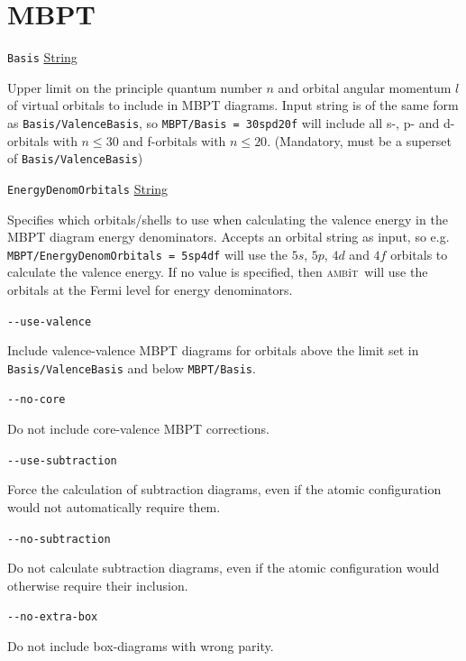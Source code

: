 \documentclass{report}
\newcommand{\ambit}{\textsc{amb}{\footnotesize i}\textsc{t}}
\begin{document}
\section{MBPT}

\texttt{Basis} \uline{String}
\begin{adjustwidth}{1cm}{}
Upper limit on the principle quantum number $n$ and orbital angular momentum $l$ of
virtual orbitals to include in MBPT diagrams. Input string is of the same form as
\texttt{Basis/ValenceBasis}, so \texttt{MBPT/Basis = 30spd20f} will include all s-, p- and d-orbitals
with $n \leq 30$ and f-orbitals with $n \leq 20$. (Mandatory, must be a superset of
\texttt{Basis/ValenceBasis})
\end{adjustwidth}

\texttt{EnergyDenomOrbitals} \uline{String}
\begin{adjustwidth}{1cm}{}
Specifies which orbitals/shells to use when calculating the valence energy
in the MBPT diagram energy denominators. Accepts an orbital string as input, so e.g. 
\texttt{MBPT/EnergyDenomOrbitals = 5sp4df} will use the $5s$, $5p$, $4d$ and $4f$ orbitals to calculate
the valence energy. If no value is specified, then \ambit\ will use the orbitals at the Fermi level for
energy denominators.
\end{adjustwidth}

\texttt{{-}{-}use-valence}
\begin{adjustwidth}{1cm}{}
Include valence-valence MBPT diagrams for orbitals above the limit set in \texttt{Basis/ValenceBasis} 
and below \texttt{MBPT/Basis}.
\end{adjustwidth}

\texttt{{-}{-}no-core}
\begin{adjustwidth}{1cm}{}
Do not include core-valence MBPT corrections.
\end{adjustwidth}

\texttt{{-}{-}use-subtraction}
\begin{adjustwidth}{1cm}{}
Force the calculation of subtraction diagrams, even if the atomic configuration would not automatically
require them.
\end{adjustwidth}

\texttt{{-}{-}no-subtraction}
\begin{adjustwidth}{1cm}{}
Do not calculate subtraction diagrams, even if the atomic configuration would otherwise require their
inclusion.
\end{adjustwidth}

\texttt{{-}{-}no-extra-box}
\begin{adjustwidth}{1cm}{}
Do not include box-diagrams with wrong parity.
\end{adjustwidth}
\end{document}
